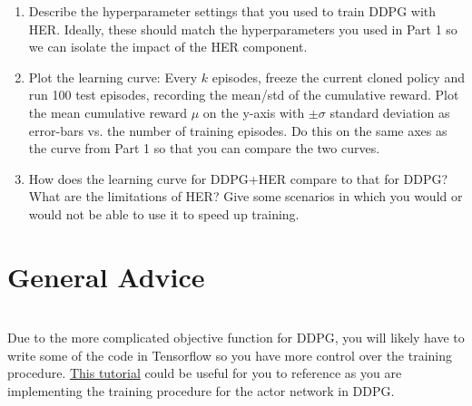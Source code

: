 \documentclass[12pt]{article}
\begin{document}
\begin{enumerate}
\item Describe the hyperparameter settings that you used to train DDPG with HER.  Ideally, these should match the hyperparameters you used in Part 1 so we can isolate the impact of the HER component.
 \begin{solution}
\end{solution}
\item  Plot the learning curve: Every $k$ episodes, freeze the current cloned policy and run 100 test episodes, recording the mean/std of the cumulative reward. Plot the mean cumulative reward $\mu$ on the y-axis with $\pm \sigma$ standard deviation as error-bars vs. the number of training episodes.  Do this on the same axes as the curve from Part 1 so that you can compare the two curves.  
 \begin{solution}
\end{solution}
\item How does the learning curve for DDPG+HER compare to that for DDPG?  What are the limitations of HER?  Give some scenarios in which you would or would not be able to use it to speed up training. 
\begin{solution}
\end{solution}
\end{enumerate}

\section*{General Advice}
\ \\
Due to the more complicated objective function for DDPG, you will likely have to write some of the code in Tensorflow so you have more control over the training procedure.  \href{https://www.tensorflow.org/tutorials/eager/custom_training_walkthrough}{This tutorial} could be useful for you to reference as you are implementing the training procedure for the actor network in DDPG.


\end{document}
